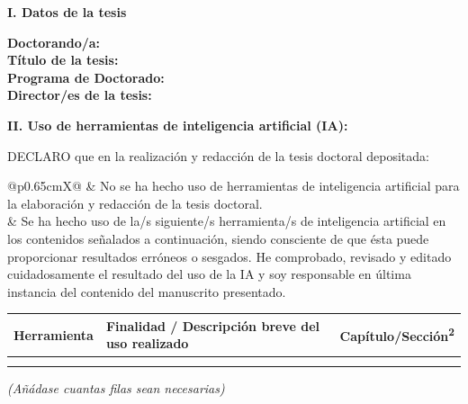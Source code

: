 \documentclass[10pt,a4paper,oneside]{article}
\providecommand{\myAIUsed}{Sí}
\providecommand{\myAIToolName}{}
\providecommand{\myAIPurpose}{}
\providecommand{\myAIThesisSections}{}
\providecommand{\myAIUsageRows}{\myAIToolName & \myAIPurpose & \myAIThesisSections\\\hline}
\begin{document}
\fontsize{10}{12}\selectfont
{}

\textbf{I. Datos de la tesis}

\vspace{0.20cm}
\textbf{Doctorando/a:} \PhDUnderline{14.0cm}{\myAuthorFullName}\\[0.28cm]
\textbf{Título de la tesis:} \PhDUnderline{13.2cm}{\myBookTitle}\\[0.28cm]
\textbf{Programa de Doctorado:} \PhDUnderline{11.6cm}{\myPhDProgram}\\[0.28cm]
\textbf{Director/es de la tesis:} \PhDUnderline{12.0cm}{\myAcademicTutorFullName\ifCoTutorPresent{, \myCoTutorFullName}{}}

\vspace{0.45cm}
\textbf{II. Uso de herramientas de inteligencia artificial (IA):}

\vspace{0.20cm}
DECLARO que en la realización y redacción de la tesis doctoral depositada:

\vspace{0.28cm}
\begin{tabularx}{\linewidth}{@{}p{0.65cm}X@{}}
\PhDChoice{\myAIUsed}{No}{} &
No se ha hecho uso de herramientas de inteligencia artificial para la elaboración y redacción de la tesis doctoral.\\[0.30cm]
\PhDChoice{\myAIUsed}{Sí}{} &
Se ha hecho uso de la/s siguiente/s herramienta/s de inteligencia artificial en los contenidos señalados a continuación, siendo consciente de que ésta puede proporcionar resultados erróneos o sesgados. He comprobado, revisado y editado cuidadosamente el resultado del uso de la IA y soy responsable en última instancia del contenido del manuscrito presentado.
\end{tabularx}

\vspace{0.35cm}
\begin{tabularx}{\linewidth}{|p{3.7cm}|X|p{4.0cm}|}
\hline
\cellcolor{PhDFormGray}\textbf{Herramienta} &
\cellcolor{PhDFormGray}\textbf{Finalidad / Descripción breve del uso realizado} &
\cellcolor{PhDFormGray}\textbf{Capítulo/Sección\textsuperscript{2}}\\\hline
\myAIUsageRows
\multicolumn{3}{|c|}{\rule{0pt}{0.85cm}}\\\hline
\end{tabularx}
\textit{(Añádase cuantas filas sean necesarias)}
\end{document}
